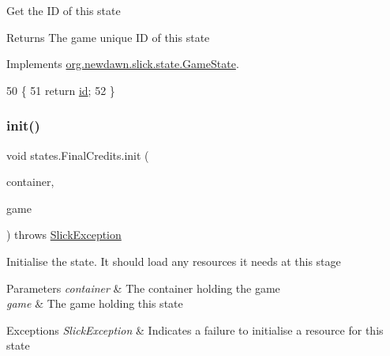 Get the ID of this state

\begin{DoxyReturn}{Returns}
The game unique ID of this state 
\end{DoxyReturn}


Implements \mbox{\hyperlink{interfaceorg_1_1newdawn_1_1slick_1_1state_1_1_game_state_a54f2bc6a91feaf0614a5ef19f1d03313}{org.\+newdawn.\+slick.\+state.\+Game\+State}}.


\begin{DoxyCode}
50                        \{
51         \textcolor{keywordflow}{return} \mbox{\hyperlink{classstates_1_1_final_credits_afdc1fee5ede57fa6fcc6d70025a0b7c5}{id}};
52     \}
\end{DoxyCode}
\mbox{\label{classstates_1_1_final_credits_acb91cf3998cc530727fb2ca5926c57b1}} 
\subsubsection{\texorpdfstring{init()}{init()}}
{\footnotesize\ttfamily void states.\+Final\+Credits.\+init (\begin{DoxyParamCaption}\item[{final \mbox{\hyperlink{classorg_1_1newdawn_1_1slick_1_1_game_container}{Game\+Container}}}]{container,  }\item[{final \mbox{\hyperlink{classorg_1_1newdawn_1_1slick_1_1state_1_1_state_based_game}{State\+Based\+Game}}}]{game }\end{DoxyParamCaption}) throws \mbox{\hyperlink{classorg_1_1newdawn_1_1slick_1_1_slick_exception}{Slick\+Exception}}\hspace{0.3cm}{\ttfamily [inline]}}

Initialise the state. It should load any resources it needs at this stage


\begin{DoxyParams}{Parameters}
{\em container} & The container holding the game \\
\hline
{\em game} & The game holding this state \\
\hline
\end{DoxyParams}

\begin{DoxyExceptions}{Exceptions}
{\em Slick\+Exception} & Indicates a failure to initialise a resource for this state \\
\hline
\end{DoxyExceptions}


